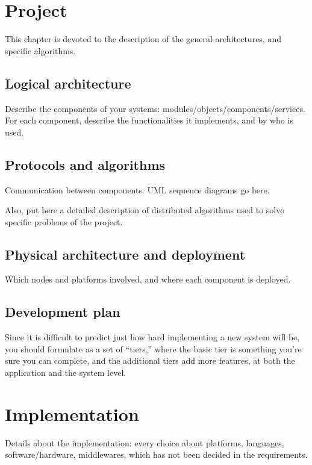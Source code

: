 \documentclass{memoir}
\begin{document}



\chapter{Project}

This chapter is devoted to the description of the general architectures, and specific algorithms.

\section{Logical architecture}
Describe the components of your systems: modules/objects/components/services.
For each component, describe the functionalities it implements, and by who is used.

\section{Protocols and algorithms}
Communication between components.  UML sequence diagrams go here.

Also, put here a detailed description of distributed algorithms used to solve specific problems of the project.

\section{Physical architecture and deployment}
Which nodes and platforms involved, and where each component is deployed.

\section{Development plan}
Since it is difficult to predict just how hard implementing a new system will be, you should formulate as a set of ``tiers,'' where the basic tier is something you’re sure you can complete, and the additional tiers add more features, at both the application and the system level.

\chapter{Implementation}

Details about the implementation: every choice about platforms, languages, software/hardware, middlewares, which has not been decided in the requirements.
\end{document}
